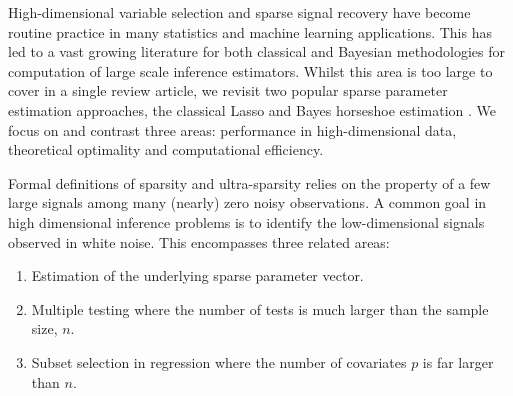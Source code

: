 \documentclass[11pt]{article}
\begin{document}



High-dimensional variable selection and sparse signal recovery have become routine practice in many statistics and machine learning applications. This has led to a vast growing literature for both classical and Bayesian methodologies for computation of large scale inference estimators. Whilst this area is too large to cover in a single review article, we revisit two popular sparse parameter estimation approaches, the classical Lasso \citep{tibshirani96} and Bayes horseshoe estimation \citep{carvalho2010horseshoe}. We focus on and contrast three areas: performance in high-dimensional data, theoretical optimality and computational efficiency. 

Formal definitions of sparsity and ultra-sparsity relies on the property of a few large signals among many (nearly) zero noisy observations. A common goal in high dimensional inference problems is to identify the low-dimensional signals observed in white noise. This encompasses three related areas: 
\begin{enumerate}
  \item Estimation of the underlying sparse parameter vector. 
  \item Multiple testing where the number of tests is much larger than the sample size, $n$. 
  \item Subset selection in regression where the number of covariates $p$ is far larger than $n$. 
\end{enumerate}
\end{document}
